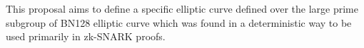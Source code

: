 This proposal aims to define a specific elliptic curve defined over the large prime subgroup of BN128 elliptic curve
which was found in a deterministic way
to be used primarily in zk-SNARK proofs.
